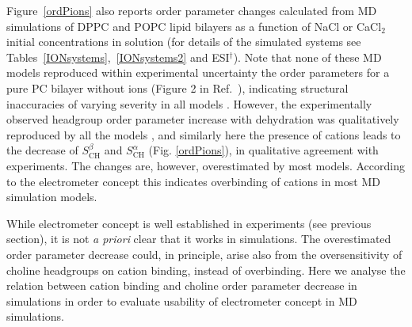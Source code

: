 \documentclass[twoside,twocolumn,9pt]{article}
\begin{document}
Figure~\ref{ordPions} also reports order parameter changes calculated from MD simulations
of DPPC and POPC lipid bilayers as a function of NaCl or CaCl$_2$ initial concentrations in solution
(for details of the simulated systems see Tables~\ref{IONsystems},~\ref{IONsystems2} and ESI$^\dag$).
Note that none of these MD models
reproduced within experimental uncertainty the order parameters for a pure PC bilayer without ions
(Figure 2 in Ref.~),
indicating structural inaccuracies of varying severity in all models \cite{botan15}.
However, the experimentally observed headgroup order parameter increase with dehydration
was qualitatively reproduced by all the models \cite{botan15}, and 
similarly here the presence of cations leads to the decrease 
of $S_\mathrm{CH}^\beta$ and $S_\mathrm{CH}^\alpha$ (Fig. \ref{ordPions}), in qualitative
agreement with experiments. The changes are, however, overestimated by most models.
According to the electrometer concept this indicates overbinding of cations in most MD simulation
models.

While electrometer concept is well established in experiments (see previous section),
it is not {\it a priori} clear that it works in simulations. The overestimated order parameter
decrease could, in principle, arise also from the oversensitivity of choline headgroups on cation binding,
instead of overbinding. Here we analyse the relation between cation binding and choline order 
parameter decrease in simulations in order to evaluate usability of electrometer concept in MD simulations.
\end{document}
